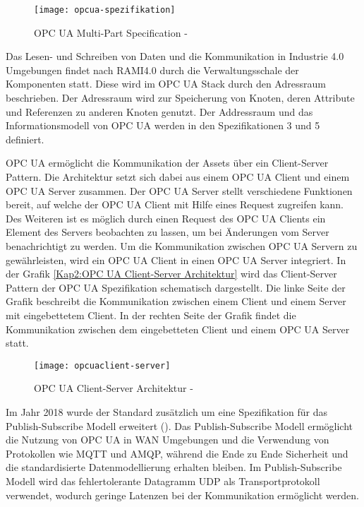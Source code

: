 \begin{figure}[h]
  \centering
  \texttt{[image: opcua-spezifikation]}
  \caption{OPC UA Multi-Part Specification - \cite{opcpt1}} 
  \label{Kap2:OPC UA Multi-Part Specification}
\end{figure}

\clearpage

Das Lesen- und Schreiben von Daten und die Kommunikation in Industrie 4.0 Umgebungen findet nach \ac{RAMI4.0} durch die Verwaltungsschale der Komponenten statt. Diese wird im \ac{OPC UA} Stack durch den Adressraum beschrieben. Der Adressraum wird zur Speicherung von Knoten, deren Attribute und Referenzen zu anderen Knoten genutzt. Der Addressraum und das Informationsmodell von \ac{OPC UA} werden in den Spezifikationen 3 \cite{opcpt3} und 5 \cite{opcpt5} definiert.

\ac{OPC UA} ermöglicht die Kommunikation der Assets über ein Client-Server Pattern. Die Architektur setzt sich dabei aus einem \ac{OPC UA} Client und einem \ac{OPC UA} Server zusammen. Der \ac{OPC UA} Server stellt verschiedene Funktionen bereit, auf welche der \ac{OPC UA} Client mit Hilfe eines Request zugreifen kann. Des Weiteren ist es möglich durch einen Request des \ac{OPC UA} Clients ein Element des Servers beobachten zu lassen, um bei Änderungen vom Server benachrichtigt zu werden. Um die Kommunikation zwischen \ac{OPC UA} Servern zu gewährleisten, wird ein \ac{OPC UA} Client in einen \ac{OPC UA} Server integriert. In der Grafik \autoref{Kap2:OPC UA Client-Server Architektur} wird das Client-Server Pattern der \ac{OPC UA} Spezifikation schematisch dargestellt. Die linke Seite der Grafik beschreibt die Kommunikation zwischen einem Client und einem Server mit eingebettetem Client. In der rechten Seite der Grafik findet die Kommunikation zwischen dem eingebetteten Client und einem \ac{OPC UA} Server statt.

\begin{figure}[h]
  \centering
  \texttt{[image: opcuaclient-server]}
  \caption{OPC UA Client-Server Architektur - \cite{opcpt1}} 
  \label{Kap2:OPC UA Client-Server Architektur}
\end{figure}

\clearpage

Im Jahr 2018 wurde der Standard zusätzlich um eine Spezifikation für das Publish-Subscribe Modell erweitert (\cite{hoppe2018}). Das Publish-Subscribe Modell ermöglicht die Nutzung von \ac{OPC UA} in \ac{WAN} Umgebungen und die Verwendung von Protokollen wie \ac{MQTT} und \ac{AMQP}, während die Ende zu Ende Sicherheit und die standardisierte Datenmodellierung erhalten bleiben. Im Publish-Subscribe Modell wird das fehlertolerante Datagramm \ac{UDP} als Transportprotokoll verwendet, wodurch geringe Latenzen bei der Kommunikation ermöglicht werden.

